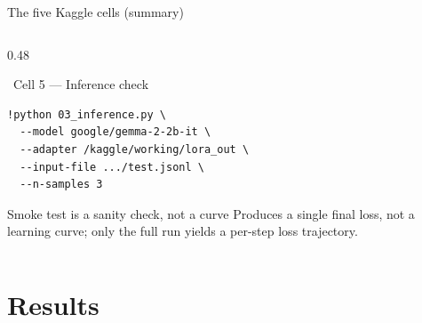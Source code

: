 \documentclass[aspectratio=169, 10pt]{beamer}
\begin{document}
\begin{frame}[fragile]{The five Kaggle cells (summary)}
\begin{columns}[T]
\begin{column}{0.48\textwidth}
      \vspace{-2mm}
      \begin{block}{\faSearch\ Cell 5 --- Inference check}
      \begin{lstlisting}[style=kcell]
!python 03_inference.py \
  --model google/gemma-2-2b-it \
  --adapter /kaggle/working/lora_out \
  --input-file .../test.jsonl \
  --n-samples 3
      \end{lstlisting}
      \end{block}
      \vspace{-2mm}
      \begin{alertblock}{Smoke test is a sanity check, not a curve}
      \scriptsize
      Produces a single final loss, not a learning curve; only the full
      run yields a per-step loss trajectory.
      \end{alertblock}
    \end{column}
  \end{columns}
\end{frame}

\section{Results}
\end{document}
